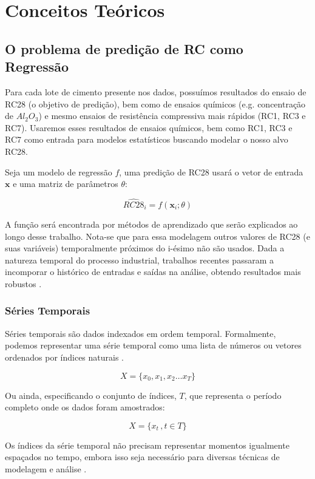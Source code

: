 \chapter{Conceitos Teóricos}
\label{cap:conceitos}


\section{O problema de predição de RC como Regressão}

Para cada lote de cimento presente nos dados, possuímos resultados do ensaio de
RC28 (o objetivo de predição), bem como de ensaios químicos (e.g. concentração
de $Al_2O_3$) e mesmo ensaios de resistência compressiva mais rápidos (RC1, RC3 e RC7). Usaremos esses resultados
de ensaios químicos, bem como RC1, RC3 e RC7 como entrada para modelos
estatísticos buscando modelar o nosso alvo RC28.

Seja um modelo de regressão $f$, uma predição de RC28 usará o vetor de entrada
$\textbf{x}$ e uma matriz de parâmetros $\theta$:

\[
  \hat{RC28}_i = f(\textbf{x}_i;\theta)
\]


A função será encontrada por métodos de aprendizado que serão explicados ao
longo desse trabalho. Nota-se que para essa modelagem outros valores de RC28 (e suas variáveis) temporalmente próximos do
i-ésimo não são usados. Dada a natureza temporal do processo industrial,
trabalhos recentes passaram a incomporar o histórico de entradas e saídas na
análise, obtendo resultados mais robustos \cite{grecialin}. 

\subsection{Séries Temporais}

Séries temporais são dados indexados em ordem temporal. Formalmente, podemos
representar uma série temporal como uma lista de números ou vetores ordenados
por índices naturais \citep{spec}.

\[
X = \{x_0,x_1,x_2 \dots x_T\}
\]

Ou ainda, especificando o conjunto de índices, $T$, que representa o período
completo onde os dados foram amostrados:


\[
  X = \{x_t \, , t \in T\}
\]


Os índices da série temporal não precisam representar momentos igualmente
espaçados no tempo, embora isso seja necessário para diversas técnicas de
modelagem e análise \citep{ARIMA_LSTM}.


